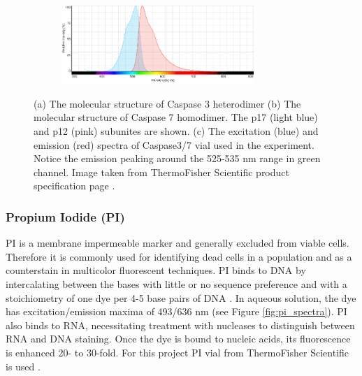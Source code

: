 \documentclass[pdftex,12pt,a4paper]{report}
\begin{document}
\begin{figure}[H]
\centering

\begin{subfigure}{\textwidth}
  \centering
  \includegraphics[width=0.8\textwidth]{images/caspase37_spectra}
  \caption{}
  \label{fig:caspase_spectra}
\end{subfigure}%

\caption[The structure and mechanism of Caspase 3/7]{(a) The molecular structure of Caspase 3 heterodimer (b) The molecular structure of Caspase 7 homodimer. The p17 (light blue) and p12 (pink) subunites are shown. (c) The excitation (blue) and emission (red) spectra of Caspase3/7 vial used in the experiment. Notice the emission peaking around the 525-535 nm range in green channel. Image taken from ThermoFisher Scientific product specification page \cite{thermofisher2018casp}.}

\label{fig:caspase_stain}
\end{figure}

\subsubsection*{Propium Iodide (PI)}

PI is a membrane impermeable marker and generally excluded from viable cells. Therefore it is commonly used for identifying dead cells in a population and as a counterstain in multicolor fluorescent techniques. PI binds to DNA by intercalating between the bases with little or no sequence preference and with a stoichiometry of one dye per 4-5 base pairs of DNA \cite{suzuki1997dna}.  In aqueous solution, the dye has excitation/emission maxima of 493/636 nm (see Figure \ref{fig:pi_spectra}). PI also binds to RNA, necessitating treatment with nucleases to distinguish between RNA and DNA staining. Once the dye is bound to nucleic acids, its fluorescence is enhanced 20- to 30-fold. For this project PI vial from ThermoFisher Scientific is used \cite{thermofisher2018pi}.
\end{document}
